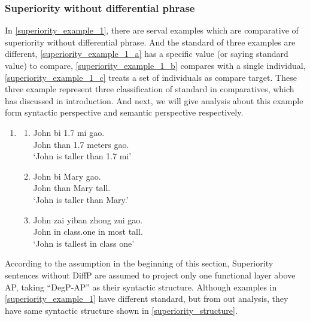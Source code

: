 \documentclass{ctexart}
\begin{document}
\subsubsection{Superiority without differential phrase}

\noindent
In \ref{superiority_example_1}, there are serval examples which are comparative of superiority without differential phrase. And the standard of three examples are different, \ref{superiority_example_1_a} has a specific value (or saying standard value) to compare, \ref{superiority_example_1_b} compares with a single individual, \ref{superiority_example_1_c} treats a set of individuals as compare target. These three example represent three classification of standard in comparatives, which has discussed in introduction. And next, we will give analysis about this example form syntactic perspective and semantic perspective respectively.

\begin{enumerate}
    \item \label{superiority_example_1}
    \begin{enumerate}
        \item \label{superiority_example_1_a}
        John bi 1.7 mi gao. \\
        John than 1.7 meters gao. \\
        `John is taller than 1.7 mi' 

        \item \label{superiority_example_1_b}
        John bi Mary gao. \\
        John than Mary tall. \\
        `John is taller than Mary.' 

        \item \label{superiority_example_1_c}
        John zai yiban zhong zui gao. \\
        John in class.one in most tall. \\
        `John is tallest in class one' 

    \end{enumerate}
\end{enumerate}

According to the assumption in the beginning of this section, Superiority sentences without DiffP are assumed to project only one functional layer above AP, taking ``DegP-AP'' as their syntactic structure. Although examples in \ref{superiority_example_1} have different standard, but from out analysis, they have same syntactic structure shown in \ref{superiority_structure}.
\end{document}
